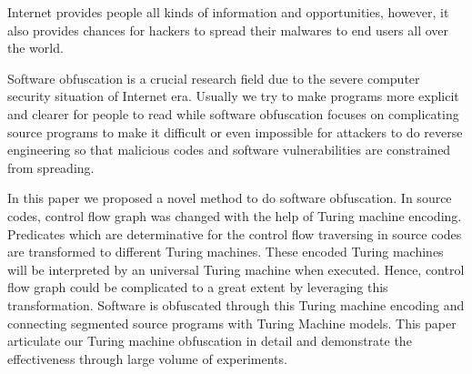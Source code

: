 Internet provides people all kinds of information and opportunities, however, it also provides chances for hackers to spread their malwares to end users all over the world.

Software obfuscation is a crucial research field due to the
severe computer security situation of Internet era. Usually we try to make programs more explicit and clearer for people to read while software obfuscation focuses on 
complicating source programs to make it difficult or even impossible for attackers to do reverse engineering so that malicious codes and
software vulnerabilities are constrained from spreading. 

In this paper we proposed a novel method to do software obfuscation. In source codes, control flow graph was changed with the help of Turing machine encoding.
Predicates which are determinative for the control flow traversing in source codes are transformed to different Turing machines. These encoded Turing machines will be interpreted by an universal Turing machine when executed. Hence, control flow graph could be complicated to a great extent
by leveraging this transformation. Software is obfuscated
through this Turing machine encoding and connecting segmented source programs with Turing Machine models. This paper articulate our Turing machine obfuscation in detail and demonstrate the effectiveness through large volume of experiments.